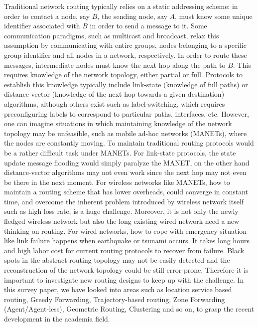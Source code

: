 \documentclass[conference]{IEEEtran}
\begin{document}
Traditional network routing typically relies on a static addressing scheme: in order to contact a node, say $B$, the sending node, say $A$, must know some unique identifier associated with $B$ in order to send a message to it.
Some communication paradigms, such as multicast and broadcast, relax this assumption by communicating with entire groups, nodes belonging to a specific group identifier and all nodes in a network, respectively.
In order to route these messages, intermediate nodes must know the next hop along the path to $B$.
This requires knowledge of the network topology, either partial or full.
Protocols to establish this knowledge typically include link-state (knowledge of full paths) or distance-vector (knowledge of the next hop towards a given destination) algorithms, although others exist such as label-switching, which requires preconfiguring labels to correspond to particular paths, interfaces, etc.
%
However, one can imagine situations in which maintaining knowledge of the network topology may be unfeasible, such as mobile ad-hoc networks (MANETs), where the nodes are constantly moving. To maintain traditional routing protocols would be a rather difficult task under MANETs. For link-state protocols, the state update message flooding would simply paralyze the MANET, on the other hand distance-vector algorithms may not even work since the next hop may not even be there in the next moment. For wireless networks like MANETs, how to maintain a routing scheme that has lower overheads, could converge in constant time, and overcome the inherent problem introduced by wireless network itself such as high loss rate, is a huge challenge.
%
Moreover, it is not only the newly fledged wireless network but also the long existing wired network need a new thinking on routing. For wired networks, how to cope with emergency situation like link failure happens when earthquake or tsunami occurs. It takes long hours and high labor cost for current routing protocols to recover from failure. Black spots in the abstract routing topology may not be easily detected and the reconstruction of the network topology could be still error-prone.
%
Therefore it is important to investigate new routing designs to keep up with the challenge. In this survey paper, we have looked into areas such as location service based routing,  Greedy Forwarding, Trajectory-based routing, Zone Forwarding (Agent/Agent-less),   Geometric Routing, Clustering and so on, to grasp the recent development in the academia field.


\end{document}
